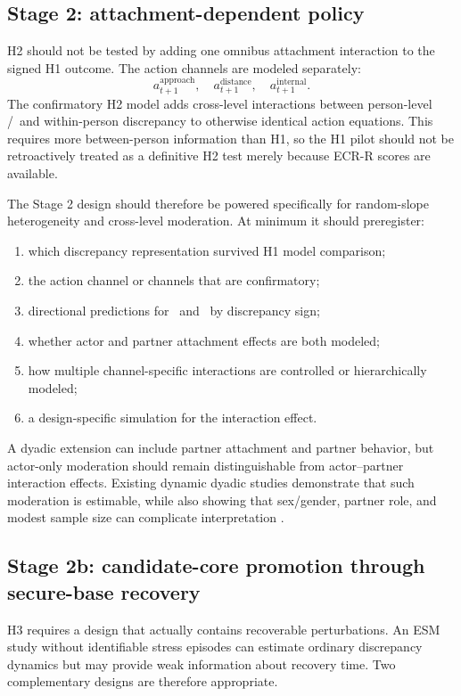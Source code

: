 \subsection{Stage 2: attachment-dependent policy}

H2 should not be tested by adding one omnibus attachment interaction to the signed H1 outcome. The action channels are modeled separately:
\[
a^{\mathrm{approach}}_{t+1},\quad
a^{\mathrm{distance}}_{t+1},\quad
a^{\mathrm{internal}}_{t+1}.
\]
The confirmatory H2 model adds cross-level interactions between person-level \Anx/\Avo\ and within-person discrepancy to otherwise identical action equations. This requires more between-person information than H1, so the H1 pilot should not be retroactively treated as a definitive H2 test merely because ECR-R scores are available.

The Stage 2 design should therefore be powered specifically for random-slope heterogeneity and cross-level moderation. At minimum it should preregister:
\begin{enumerate}[label=(\arabic*)]
\item which discrepancy representation survived H1 model comparison;
\item the action channel or channels that are confirmatory;
\item directional predictions for \Anx\ and \Avo\ by discrepancy sign;
\item whether actor and partner attachment effects are both modeled;
\item how multiple channel-specific interactions are controlled or hierarchically modeled;
\item a design-specific simulation for the interaction effect.
\end{enumerate}

A dyadic extension can include partner attachment and partner behavior, but actor-only moderation should remain distinguishable from actor--partner interaction effects. Existing dynamic dyadic studies demonstrate that such moderation is estimable, while also showing that sex/gender, partner role, and modest sample size can complicate interpretation \parencite{xie2025interdependence}.

\subsection{Stage 2b: candidate-core promotion through secure-base recovery}

H3 requires a design that actually contains recoverable perturbations. An ESM study without identifiable stress episodes can estimate ordinary discrepancy dynamics but may provide weak information about recovery time. Two complementary designs are therefore appropriate.


